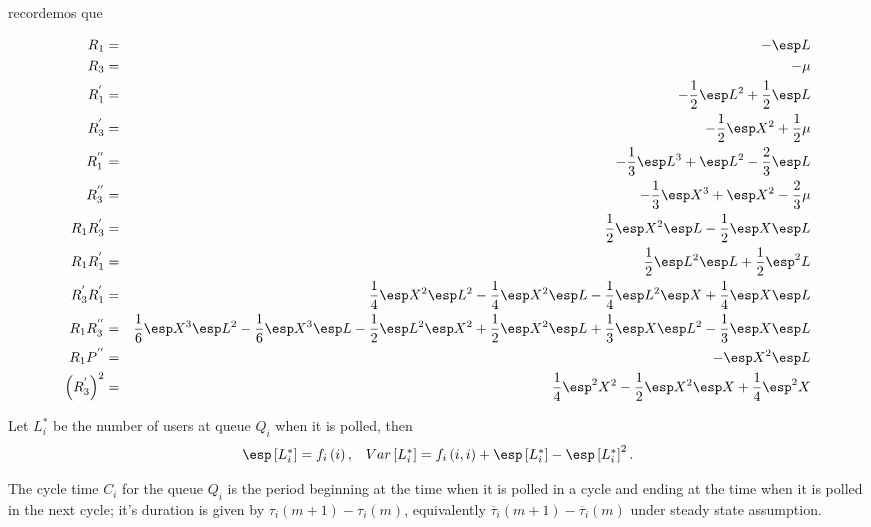recordemos que


\begin{eqnarray*}
R_{1}&=&-\esp L\\
R_{3}&=& -\mu\\
R_{1}^{'}&=&-\frac{1}{2}\esp L^{2}+\frac{1}{2}\esp L\\
R_{3}^{'}&=&-\frac{1}{2}\esp X^{2}+\frac{1}{2}\mu\\
R_{1}^{''}&=&-\frac{1}{3}\esp L^{3}+\esp L^{2}-\frac{2}{3}\esp L\\
R_{3}^{''}&=&-\frac{1}{3}\esp X^{3}+\esp X^{2}-\frac{2}{3}\mu\\
R_{1}R_{3}^{'}&=&\frac{1}{2}\esp X^{2}\esp L-\frac{1}{2}\esp X\esp L\\
R_{1}R_{1}^{'}&=&\frac{1}{2}\esp L^{2}\esp L+\frac{1}{2}\esp^{2}L\\
R_{3}^{'}R_{1}^{'}&=&\frac{1}{4}\esp X^{2}\esp L^{2}-\frac{1}{4}\esp X^{2}\esp L-\frac{1}{4}\esp L^{2}\esp X+\frac{1}{4}\esp X\esp L\\
R_{1}R_{3}^{''}&=&\frac{1}{6}\esp X^{3}\esp L^{2}-\frac{1}{6}\esp X^{3}\esp L-\frac{1}{2}\esp L^{2}\esp X^{2}+\frac{1}{2}\esp X^{2}\esp L+\frac{1}{3}\esp X\esp L^{2}-\frac{1}{3}\esp X\esp L\\
R_{1}P^{''}&=&-\esp X^{2}\esp L\\
\left(R_{3}^{'}\right)^{2}&=&\frac{1}{4}\esp^{2}X^{2}-\frac{1}{2}\esp X^{2}\esp X+\frac{1}{4}\esp^{2} X
\end{eqnarray*}




\begin{Def}
Let $L_{i}^{*}$ be the number of users at queue $Q_{i}$ when it is polled, then
\begin{eqnarray}
\begin{array}{cc}
\esp\left[L_{i}^{*}\right]=f_{i}\left(i\right), &
Var\left[L_{i}^{*}\right]=f_{i}\left(i,i\right)+\esp\left[L_{i}^{*}\right]-\esp\left[L_{i}^{*}\right]^{2}.
\end{array}
\end{eqnarray}
\end{Def}

\begin{Def}
The cycle time $C_{i}$ for the queue $Q_{i}$ is the period beginning at the time when it is polled in a cycle and ending at the time when it is polled in the next cycle; it's duration is given by $\tau_{i}\left(m+1\right)-\tau_{i}\left(m\right)$, equivalently $\overline{\tau}_{i}\left(m+1\right)-\overline{\tau}_{i}\left(m\right)$ under steady state assumption.
\end{Def}

